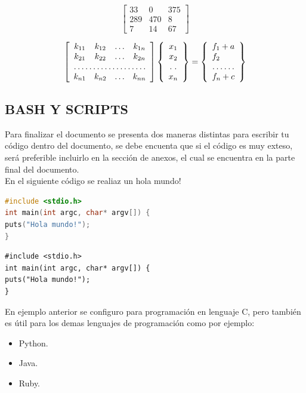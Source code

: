 \documentclass[journal, spanish]{IEEEtran}
\begin{document}
\begin{equation*}
    \left[ \begin{array}{rrr}
    33 & 0 & 375\\
    289 & 470 & 8\\
    7 & 14 & 67
    \end{array} \right]
\end{equation*}

\begin{equation*}
    \left[\begin{array}{cccc}
    k_{11} & k_{12} & \ldots & k_{1n}\\
    k_{21} & k_{22} & \ldots & k_{2n}\\
    \hdotsfor{4}\\
    k_{n1} & k_{n2} & \ldots & k_{nn}
    \end{array}\right]
    \left\{\begin{array}{c}
    x_1\\x_2\\ \hdotsfor{1}\\x_n
    \end{array}\right\} =
    \left\{\begin{array}{l}
    f_1+a\\f_2\\ \hdotsfor{1}\\f_n+c
    \end{array}\right\}
\end{equation*}
\subsection{BASH Y SCRIPTS}
Para finalizar el documento se presenta dos maneras distintas para escribir tu código dentro del documento, se debe encuenta que si el código es muy exteso, será preferible incluirlo en la sección de anexos, el cual se encuentra en la parte final del documento. \\

\noindent En el siguiente código se realiaz un  hola mundo!
\begin{lstlisting}[language=C]
#include <stdio.h>
int main(int argc, char* argv[]) {
puts("Hola mundo!");
}
\end{lstlisting}
\begin{verbatim}
#include <stdio.h>
int main(int argc, char* argv[]) {
puts("Hola mundo!");
}
\end{verbatim}
En ejemplo anterior se configuro para programación en lenguaje C, pero también es útil para los demas lenguajes de programación como por ejemplo:
\begin{itemize}
    \item Python.
    \item Java.
    \item Ruby.
\end{itemize}
\end{document}

